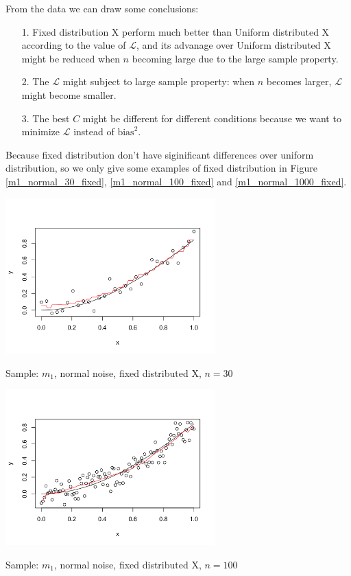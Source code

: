 \documentclass[twoside]{article}
\begin{document}
From the data we can draw some conclusions:

\begin{itemize}
  \item[1.] Fixed distribution X perform much better than Uniform distributed X according to the value of $\mathcal{L}$, and its advanage over Uniform distributed X might be reduced when $n$ becoming large due to the large sample property.
  \item[2.] The $\mathcal{L}$ might subject to large sample property: when $n$ becomes larger, $\mathcal{L}$ might become smaller.
  \item[3.] The best $C$ might be different for different conditions because we want to minimize $\mathcal{L}$ instead of $\mathrm{bias}^2$.
\end{itemize}

Because fixed distribution don't have siginificant differences over uniform distribution, so we only give some examples of fixed distribution in Figure \ref{m1_normal_30_fixed}, \ref{m1_normal_100_fixed} and \ref{m1_normal_1000_fixed}.

\begin{center}
\makeatletter
\def\@captype{figure}
\makeatother
\includegraphics [height=6cm]{code/m1_normal_30_fixed.png}
\caption{Sample: $m_1$, normal noise, fixed distributed X, $n=30$}
\label{m1_normal_30_fixed}
\end{center}

\begin{center}
\makeatletter
\def\@captype{figure}
\makeatother
\includegraphics [height=6cm]{code/m1_normal_100_fixed.png}
\caption{Sample: $m_1$, normal noise, fixed distributed X, $n=100$}
\label{m1_normal_100_fixed}
\end{center}
\end{document}
